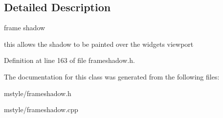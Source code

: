 \subsection{Detailed Description}
frame shadow 

this allows the shadow to be painted over the widgets viewport 

Definition at line 163 of file frameshadow.\+h.



The documentation for this class was generated from the following files\+:\begin{DoxyCompactItemize}
\item 
mstyle/frameshadow.\+h\item 
mstyle/frameshadow.\+cpp\end{DoxyCompactItemize}
